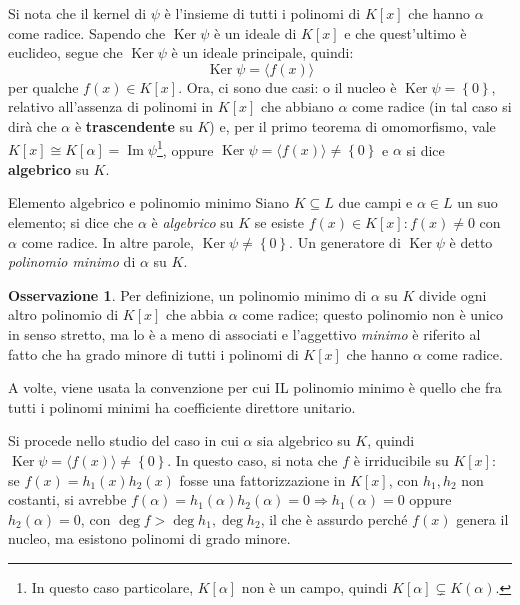 \documentclass[11pt, a4paper]{scrartcl}
\theoremstyle{definition}
\numberwithin{esempio}{section}
\theoremstyle{definition}
\newtheorem{obs}{Osservazione}
\numberwithin{obs}{section}
\numberwithin{nota}{section}
\numberwithin{equation}{subsection}
\begin{document}
Si nota che il kernel di $\psi $ \`e l'insieme di tutti i polinomi di $K[x]$ che hanno $\alpha $ come radice. 
Sapendo che $\operatorname{Ker} \psi $ \`e un ideale di $K[x]$ e che quest'ultimo \`e euclideo, segue che $\operatorname{Ker} \psi $ \`e un ideale principale, quindi:
\[
\operatorname{Ker} \psi  = \langle f(x) \rangle
\] 
per qualche $f(x) \in K[x]$.
Ora, ci sono due casi: o il nucleo \`e $\operatorname{Ker} \psi  = \left\{ 0 \right\} $, relativo all'assenza di polinomi in $K[x]$ che abbiano $\alpha$ come radice (in tal caso si dir\`a che $\alpha $ \`e \textbf{trascendente} su $K$) e, per il primo teorema di omomorfismo, vale $K[x] \cong K[\alpha ] = \operatorname{Im} \psi $\footnote{In questo caso particolare, $K[\alpha ]$ non \`e un campo, quindi $K[\alpha ]\subsetneq K(\alpha )$.}, oppure $\operatorname{Ker} \psi = \langle f(x) \rangle \neq \left\{ 0 \right\} $ e $\alpha $ si dice \textbf{algebrico} su $K$.
\begin{definizione}
	{Elemento algebrico e polinomio minimo}{}
	Siano $K \subseteq L$ due campi e $\alpha \in L $ un suo elemento; si dice che $\alpha $ \`e \textit{algebrico} su $K$ se esiste $f(x) \in K[x] : f(x) \neq 0$ con $\alpha $ come radice.
	In altre parole, $\operatorname{Ker} \psi \neq \left\{ 0 \right\} $.
	Un generatore di $ \operatorname{Ker} \psi $ \`e detto \textit{polinomio minimo} di $\alpha $ su $K$.
\end{definizione}
\begin{obs}
	Per definizione, un polinomio minimo di $\alpha $ su $K$ divide ogni altro polinomio di $K[x]$ che abbia $\alpha $ come radice; questo polinomio non \`e unico in senso stretto, ma lo \`e a meno di associati e l'aggettivo \textit{minimo} \`e riferito al fatto che ha grado minore di tutti i polinomi di $K[x]$ che hanno $\alpha $ come radice. 

	A volte, viene usata la convenzione per cui IL polinomio minimo \`e quello che fra tutti i polinomi minimi ha coefficiente direttore unitario.
\end{obs}
\noindent Si procede nello studio del caso in cui $\alpha $ sia algebrico su $K$, quindi $\operatorname{Ker} \psi = \langle f(x) \rangle\neq \left\{ 0 \right\} $.
In questo caso, si nota che $f$ \`e irriducibile su $K[x]$: se $f(x)=h_1(x)h_2(x)$ fosse una fattorizzazione in $K[x]$, con $h_1,h_2$ non costanti, si avrebbe $f(\alpha ) = h_1(\alpha ) h_2(\alpha ) = 0\Rightarrow h_1(\alpha ) = 0$ oppure $h_2(\alpha ) = 0 $, con $\operatorname{deg}  f >\operatorname{deg} h_1, \operatorname{deg} h_2 $, il che \`e assurdo perch\'e $f(x)$ genera il nucleo, ma esistono polinomi di grado minore.
\end{document}
